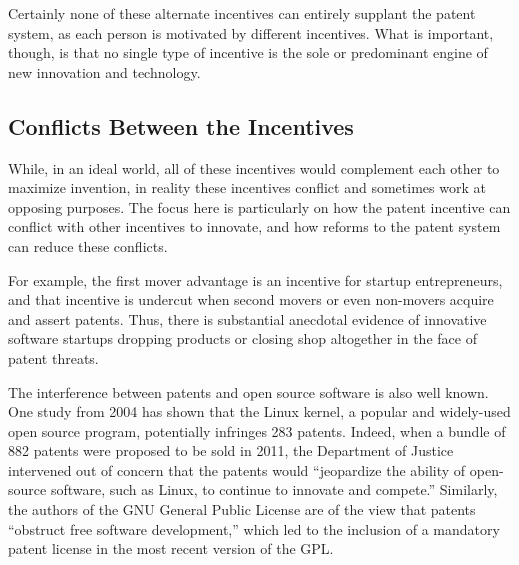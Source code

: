 \documentclass[11pt,twocolumn,titlepage]{article}
\begin{document}
Certainly none of these alternate incentives can entirely supplant the patent
system, as each person is motivated by different incentives. What is important,
though, is that no single type of incentive is the sole or predominant engine of
new innovation and technology.

\subsection{Conflicts Between the Incentives}
\SectionNote

While, in an ideal world, all of these
incentives would complement each other to maximize invention, in reality these
incentives conflict and sometimes work at opposing purposes. The focus here is
particularly on how the patent incentive can conflict with other incentives to
innovate, and how reforms to the patent system can reduce these conflicts.

For example, the first mover advantage is an incentive for startup
entrepreneurs, and that incentive is undercut when second movers or even
non-movers acquire and assert patents. Thus, there is substantial anecdotal
evidence of innovative software startups dropping products or closing shop
altogether in
the face of patent threats.

The interference between patents and open source software is also well known.
One study from 2004 has shown that the Linux kernel, a popular and widely-used
open source program, potentially infringes 283 patents.
Indeed, when a bundle
of 882 patents were proposed to be sold in 2011, the Department of Justice
intervened out of concern that the patents would ``jeopardize the ability of
open-source software, such as Linux, to continue to innovate and
compete.''
Similarly, the authors of the GNU General Public License are of the view that
patents ``obstruct free software development,'' which led to the inclusion of a
mandatory patent license in the most recent version of the GPL.
\end{document}
